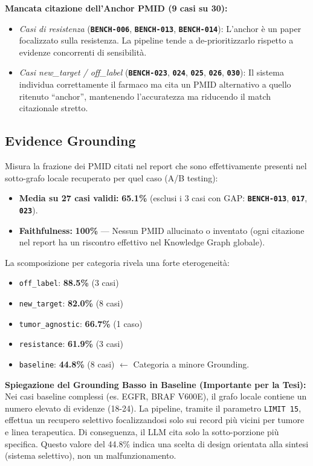 \documentclass[12pt, a4paper]{article}
\newcommand{\bench}[1]{{\texttt{\textbf{#1}}}}
\begin{document}
\textbf{Mancata citazione dell'Anchor PMID (9 casi su 30):}
\begin{itemize}[leftmargin=1.6em, itemsep=2pt]
  \item \textit{Casi di resistenza} (\bench{BENCH-006}, \bench{BENCH-013}, \bench{BENCH-014}): L'anchor è un paper focalizzato sulla resistenza. La pipeline tende a de-prioritizzarlo rispetto a evidenze concorrenti di sensibilità.
  \item \textit{Casi new\_target / off\_label} (\bench{BENCH-023}, \bench{024}, \bench{025}, \bench{026}, \bench{030}): Il sistema individua correttamente il farmaco ma cita un PMID alternativo a quello ritenuto ``anchor'', mantenendo l'accuratezza ma riducendo il match citazionale stretto.
\end{itemize}

\subsection{Evidence Grounding}
Misura la frazione dei PMID citati nel report che sono effettivamente presenti nel sotto-grafo locale recuperato per quel caso (A/B testing):
\begin{itemize}[leftmargin=1.6em, itemsep=2pt]
  \item \textbf{Media su 27 casi validi:} \textbf{65.1\%} (esclusi i 3 casi con GAP: \bench{BENCH-013}, \bench{017}, \bench{023}).
  \item \textbf{Faithfulness:} \textbf{100\%} --- Nessun PMID allucinato o inventato (ogni citazione nel report ha un riscontro effettivo nel Knowledge Graph globale).
\end{itemize}

La scomposizione per categoria rivela una forte eterogeneità:
\begin{itemize}[leftmargin=1.6em, itemsep=2pt]
  \item \texttt{off\_label}: \textbf{88.5\%} (3 casi)
  \item \texttt{new\_target}: \textbf{82.0\%} (8 casi)
  \item \texttt{tumor\_agnostic}: \textbf{66.7\%} (1 caso)
  \item \texttt{resistance}: \textbf{61.9\%} (3 casi)
  \item \texttt{baseline}: \textbf{44.8\%} (8 casi) $\leftarrow$ Categoria a minore Grounding.
\end{itemize}

\begin{insightbox}
\textbf{Spiegazione del Grounding Basso in Baseline (Importante per la Tesi):}
\\
Nei casi baseline complessi (es. EGFR, BRAF V600E), il grafo locale contiene un numero elevato di evidenze (18-24). La pipeline, tramite il parametro \texttt{LIMIT 15}, effettua un recupero selettivo focalizzandosi solo sui record più vicini per tumore e linea terapeutica. Di conseguenza, il LLM cita solo la sotto-porzione più specifica. Questo valore del 44.8\% indica una scelta di design orientata alla sintesi (sistema selettivo), non un malfunzionamento.
\end{insightbox}
\end{document}
